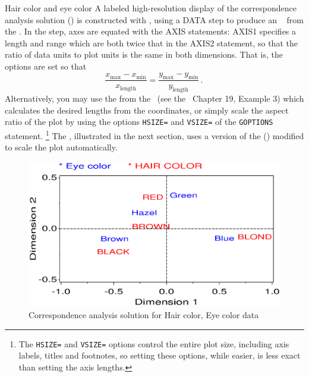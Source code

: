 \begin{Example}[haireye3]{Hair color and eye color}
A labeled high-resolution display of the correspondence analysis
solution () is constructed with ,
using a DATA step to produce an \ADS\  from
the  \Dset.  In the  step, axes are equated with
the AXIS statements: AXIS1 specifies a length and range which are
both twice that in the AXIS2 statement, so that the ratio of data
units to plot units is the same in both dimensions.
That is, the  options are set so that
\begin{equation*}
 \frac{ x_{\mbox{max}} - x_{\mbox{min}} } {  x_{\mbox{length}}} =
 \frac{ y_{\mbox{max}} - y_{\mbox{min}} } {  y_{\mbox{length}}}
 \period
\end{equation*}
Alternatively, you may use the 
from the \SASSAMP\,
(see the \STUG\, Chapter 19, Example 3) 
which calculates the
desired lengths from the coordinates, or simply scale the aspect ratio
of the plot by using the options \texttt{HSIZE=} and \texttt{VSIZE=}
of the \texttt{GOPTIONS} statement.%
\footnote{The \texttt{HSIZE=} and \texttt{VSIZE=} options control the
entire plot size, including axis labels, titles and footnotes, so
setting these options, while easier, is less exact than setting the axis lengths.
}
The , illustrated in the next section, uses a version of the
 () modified to scale the plot automatically.


\begin{figure}[htb]
  \centering
  \includegraphics[scale=.7,clip=true]{ch5/fig/corresp3}
  \caption{Correspondence analysis solution for
Hair color, Eye color data}\label{fig:corresp3}
\end{figure}
\end{Example}
